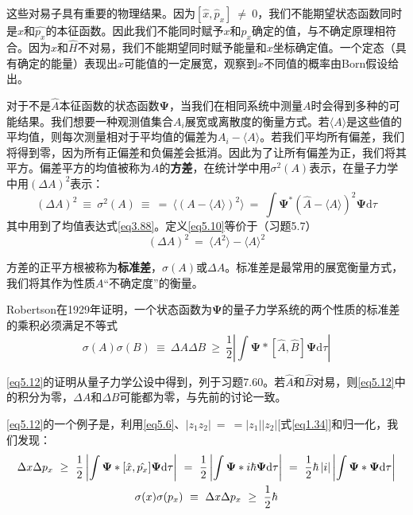 \documentclass[12pt,a4paper,openany]{ctexbook}
\newcommand{\abs}[1]{\left| #1 \right|}
\newcommand{\ang}[1]{\langle #1 \rangle}
\newcommand{\bp}{\bm{\Psi}}
\newcommand{\dd}[1]{\mathrm{d} #1}
\begin{document}
\begin{flushleft}
这些对易子具有重要的物理结果。因为$[\hat{x}, \hat{p}_x]\ \neq\ 0$，我们不能期望状态函数同时是$\hat{x}$和$\hat{p_x}$的本征函数。因此我们不能同时赋予$x$和$p_x$确定的值，与不确定原理相符合。因为$\hat{x}$和$\hat{H}$不对易，我们不能期望同时赋予能量和$x$坐标确定值。一个定态（具有确定的能量）表现出$x$可能值的一定展宽，观察到$x$不同值的概率由Born假设给出。

对于不是$\hat{A}$本征函数的状态函数$\bp$，当我们在相同系统中测量$A$时会得到多种的可能结果。我们想要一种观测值集合$A_i$展宽或离散度的衡量方式。若$\ang{A}$是这些值的平均值，则每次测量相对于平均值的偏差为$A_i-\ang{A}$。若我们平均所有偏差，我们将得到零，因为所有正偏差和负偏差会抵消。因此为了让所有偏差为正，我们将其平方。偏差平方的均值被称为$A$的\textbf{方差}，在统计学中用$\sigma^2(A)$表示，在量子力学中用$(\Delta A)^2$表示：
\begin{equation}
    (\Delta A)^2\ \equiv\ \sigma^2(A)\ \equiv\ =\ \ang{(A-\ang{A})^2}\ =\ \int \bp^*(\hat{A}-\ang{A})^2\bp\dd\tau \label{eq5.10}
\end{equation}
其中用到了均值表达式\eqref{eq3.88}。定义\eqref{eq5.10}等价于（习题5.7）
\begin{equation}
    (\Delta A)^2\ =\ \ang{A^2}-\ang{A}^2 \label{eq5.11}
\end{equation}

方差的正平方根被称为\textbf{标准差}，$\sigma(A)$或$\Delta A$。标准差是最常用的展宽衡量方式，我们将其作为性质$A$“不确定度”的衡量。

Robertson在1929年证明，一个状态函数为$\bp$的量子力学系统的两个性质的标准差的乘积必须满足不等式
\begin{equation}
    \sigma(A)\sigma(B)\ \equiv\ \Delta A\Delta B\ \geq\ \frac{1}{2}\abs{\int\bp*[\hat{A},\hat{B}]\bp\dd\tau} \label{eq5.12}
\end{equation}

\eqref{eq5.12}的证明从量子力学公设中得到，列于习题7.60。若$\hat{A}$和$\hat{B}$对易，则\eqref{eq5.12}中的积分为零，$\Delta A$和$\Delta B$可能都为零，与先前的讨论一致。

\eqref{eq5.12}的一个例子是，利用\eqref{eq5.6}、$\abs{z_1z_2}\ =\ =\abs{z_1}\abs{z_2}$[式\eqref{eq1.34}]和归一化，我们发现：
\begin{gather}
    \Delta x\Delta p_x\ \geq\ \frac{1}{2}\abs{\int\bp*[\hat{x},\hat{p_x}]\bp\dd\tau}\ =\ \frac{1}{2}\abs{\int\bp*i\hbar\bp\dd\tau}\ =\ \frac{1}{2}\hbar\abs{i}\abs{\int\bp*\bp\dd\tau} \notag \\
    \sigma(x)\sigma(p_x)\ \equiv\ \Delta x\Delta p_x\ \geq\ \frac{1}{2}\hbar \label{eq5.13}
\end{gather}


\end{flushleft}
\end{document}
